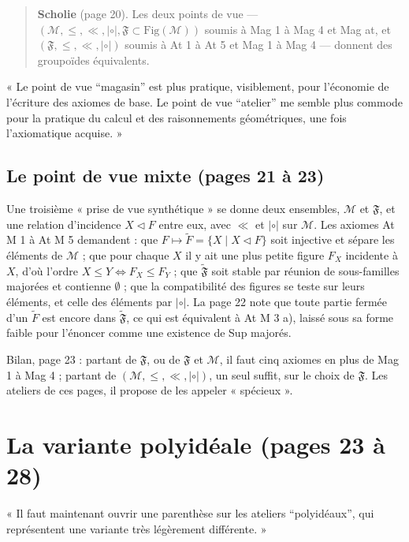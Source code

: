\documentclass[11pt,a4paper]{article}
\begin{document}
\begin{quote}
\textbf{Scholie} (page 20). Les deux points de vue --- $(\mathcal{M}, \leq,
\ll, \mathrel{|\circ|}, \mathfrak{F} \subset \mathrm{Fig}(\mathcal{M}))$ soumis
à Mag 1 à Mag 4 et Mag at, et $(\mathfrak{F}, \leq, \ll, \mathrel{|\circ|})$
soumis à At 1 à At 5 et Mag 1 à Mag 4 --- donnent des groupoïdes équivalents.
\end{quote}

« Le point de vue “magasin” est plus pratique, visiblement, pour l'économie de
l'écriture des axiomes de base. Le point de vue “atelier” me semble plus
commode pour la pratique du calcul et des raisonnements géométriques, une fois
l'axiomatique acquise. »

\subsection*{Le point de vue mixte (pages 21 à 23)}

Une troisième « prise de vue synthétique » se donne deux ensembles,
$\mathcal{M}$ et $\mathfrak{F}$, et une relation d'incidence $X \lhd F$ entre
eux, avec $\ll$ et $\mathrel{|\circ|}$ sur $\mathcal{M}$. Les axiomes At M 1 à
At M 5 demandent : que $F \mapsto \widetilde{F} = \{X \mid X \lhd F\}$ soit
injective et sépare les éléments de $\mathcal{M}$ ; que pour chaque $X$ il y ait
une plus petite figure $F_{X}$ incidente à $X$, d'où l'ordre $X \leq Y \iff
F_{X} \leq F_{Y}$ ; que $\widetilde{\mathfrak{F}}$ soit stable par réunion de
sous-familles majorées et contienne $\emptyset$ ; que la compatibilité des
figures se teste sur leurs éléments, et celle des éléments par
$\mathrel{|\circ|}$. La page 22 note que toute partie fermée d'un
$\widetilde{F}$ est encore dans $\widetilde{\mathfrak{F}}$, ce qui est
équivalent à At M 3 a), laissé sous sa forme faible pour l'énoncer comme une
existence de Sup majorés.

Bilan, page 23 : partant de $\mathfrak{F}$, ou de $\mathfrak{F}$ et
$\mathcal{M}$, il faut cinq axiomes en plus de Mag 1 à Mag 4 ; partant de
$(\mathcal{M}, \leq, \ll, \mathrel{|\circ|})$, un seul suffit, sur le choix de
$\mathfrak{F}$. Les ateliers de ces pages, il propose de les appeler
« spécieux ».

\section*{La variante polyidéale (pages 23 à 28)}

« Il faut maintenant ouvrir une parenthèse sur les ateliers “polyidéaux”, qui
représentent une variante très légèrement différente. »
\end{document}
